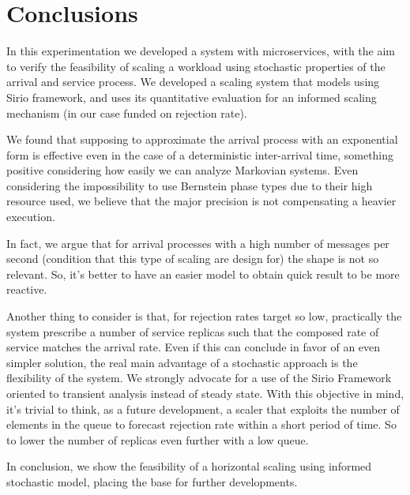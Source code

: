 \section{Conclusions}

In this experimentation we developed a system with microservices, with the aim to verify the feasibility of scaling a workload using stochastic properties of the arrival and service process. We developed a scaling system that models using Sirio framework, and uses its quantitative evaluation for an informed scaling mechanism (in our case funded on rejection rate).

We found that supposing to approximate the arrival process with an exponential form is effective even in the case of a deterministic inter-arrival time, something positive considering how easily we can analyze Markovian systems. Even considering the impossibility to use Bernstein phase types due to their high resource used, we believe that the major precision is not compensating a heavier execution.

In fact, we argue that for arrival processes with a high number of messages per second (condition  that this type of scaling are design for) the shape is not so relevant. So, it's better to have an easier model to obtain quick result to be more reactive.

Another thing to consider is that, for rejection rates target so low, practically the system prescribe a number of service replicas such that the composed rate of service matches the arrival rate. Even if this can conclude in favor of an even simpler solution, the real main advantage of a stochastic approach is the flexibility of the system. We strongly advocate for a use of the Sirio Framework oriented to transient analysis instead of steady state. With this objective in mind, it's trivial to think, as a future development, a scaler that exploits the number of elements in the queue to forecast rejection rate within a short period of time. So to lower the number of replicas even further with a low queue.

In conclusion, we show the feasibility of a horizontal scaling using informed stochastic model, placing the base for further developments.